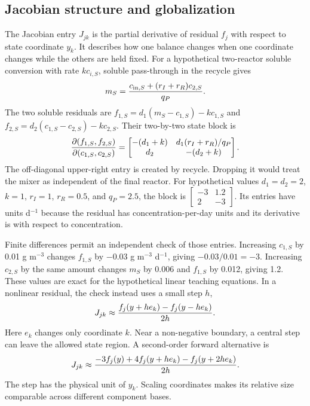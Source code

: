 \subsection{Jacobian structure and globalization}

The Jacobian entry $J_{jk}$ is the partial derivative of residual $f_j$ with respect to state coordinate $y_k$. It describes how one balance changes when one coordinate changes while the others are held fixed. For a hypothetical two-reactor soluble conversion with rate $kc_{i,S}$, soluble pass-through in the recycle gives
\begin{equation}
\equationname{Illustrative recycle-dependent soluble mixer concentration}
m_S=\frac{c_{{\rm in},S}+(r_I+r_R)c_{2,S}}{q_P}.
\end{equation}
The two soluble residuals are $f_{1,S}=d_1(m_S-c_{1,S})-kc_{1,S}$ and $f_{2,S}=d_2(c_{1,S}-c_{2,S})-kc_{2,S}$. Their two-by-two state block is
\begin{equation}
\equationname{Illustrative two-stage reactor Jacobian with recycle coupling}
\frac{\partial(f_{1,S},f_{2,S})}{\partial(c_{1,S},c_{2,S})}
=\begin{bmatrix}
-(d_1+k)&d_1(r_I+r_R)/q_P\\
d_2&-(d_2+k)
\end{bmatrix}.
\end{equation}
The off-diagonal upper-right entry is created by recycle. Dropping it would treat the mixer as independent of the final reactor. For hypothetical values $d_1=d_2=2$, $k=1$, $r_I=1$, $r_R=0.5$, and $q_P=2.5$, the block is $\begin{bmatrix}-3&1.2\\2&-3\end{bmatrix}$. Its entries have units d$^{-1}$ because the residual has concentration-per-day units and its derivative is with respect to concentration.

Finite differences permit an independent check of those entries. Increasing $c_{1,S}$ by 0.01 g m$^{-3}$ changes $f_{1,S}$ by $-0.03$ g m$^{-3}$ d$^{-1}$, giving $-0.03/0.01=-3$. Increasing $c_{2,S}$ by the same amount changes $m_S$ by 0.006 and $f_{1,S}$ by 0.012, giving 1.2. These values are exact for the hypothetical linear teaching equations. In a nonlinear residual, the check instead uses a small step $h$,
\begin{equation}
\equationname{Central finite-difference approximation of a Jacobian entry}
J_{jk}\approx\frac{f_j(y+he_k)-f_j(y-he_k)}{2h}.
\end{equation}
Here $e_k$ changes only coordinate $k$. Near a non-negative boundary, a central step can leave the allowed state region. A second-order forward alternative is
\begin{equation}
\equationname{Second-order forward finite-difference approximation of a Jacobian entry}
J_{jk}\approx\frac{-3f_j(y)+4f_j(y+he_k)-f_j(y+2he_k)}{2h}.
\end{equation}
The step has the physical unit of $y_k$. Scaling coordinates makes its relative size comparable across different component bases.

